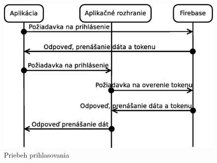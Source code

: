 \begin{figure}[h]
  \centering
  \includegraphics[scale=0.45]{fig/login.eps}
  \caption{Priebeh prihlasovania}
  \label{fig:login}
\end{figure}

